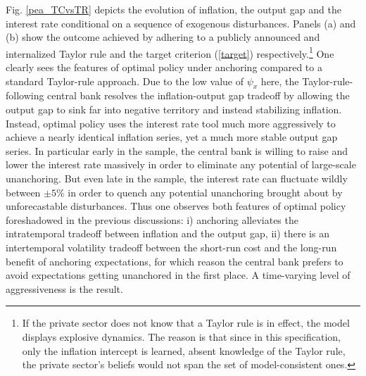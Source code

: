 \documentclass[11pt]{article}
\renewcommand{\[}{\begin{equation}}
\renewcommand{\]}{\end{equation}}
\begin{document}
Fig. \ref{pea_TCvsTR} depicts the evolution of inflation, the output gap and the interest rate conditional on a sequence of exogenous disturbances. Panels (a) and (b) show the outcome achieved by adhering to a publicly announced and internalized Taylor rule and the target criterion (\ref{target}) respectively.\footnote{If the private sector does not know that a Taylor rule is in effect, the model displays explosive dynamics. The reason is that since in this specification, only the inflation intercept is learned, absent knowledge of the Taylor rule, the private sector's beliefs would not span the set of model-consistent ones.} One clearly sees the features of optimal policy under anchoring compared to a standard Taylor-rule approach. Due to the low value of $\psi_x$ here, the Taylor-rule-following central bank resolves the inflation-output gap tradeoff by allowing the output gap to sink far into negative territory and instead stabilizing inflation. Instead, optimal policy uses the interest rate tool much more aggressively to achieve a nearly identical inflation series, yet a much more stable output gap series. In particular early in the sample, the central bank is willing to raise and lower the interest rate massively in order to eliminate any potential of large-scale unanchoring. But even late in the sample, the interest rate can fluctuate wildly between $\pm5\%$ in order to quench any potential unanchoring brought about by unforecastable disturbances. Thus one observes both features of optimal policy foreshadowed in the previous discussions: i) anchoring alleviates the intratemporal tradeoff between inflation and the output gap, ii) there is an intertemporal volatility tradeoff between the short-run cost and the long-run benefit of anchoring expectations, for which reason the central bank prefers to avoid expectations getting unanchored in the first place. A time-varying level of aggressiveness is the result.


  
\end{document}
